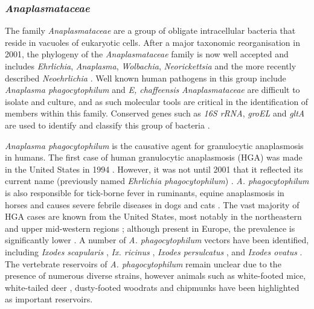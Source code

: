 \documentclass[a4paper, nobind]{templates/ociamthesis}
\begin{document}
\hypertarget{anaplasmataceae}{%
\subsubsection{\texorpdfstring{\emph{Anaplasmataceae}}{Anaplasmataceae}}\label{anaplasmataceae}}

The family \emph{Anaplasmataceae} are a group of obligate intracellular bacteria that reside in vacuoles of eukaryotic cells.
After a major taxonomic reorganisation in 2001, the phylogeny of the \emph{Anaplasmataceae} family is now well accepted and includes \emph{Ehrlichia}, \emph{Anaplasma}, \emph{Wolbachia}, \emph{Neorickettsia} and the more recently described \emph{Neoehrlichia} \autocite{rarGeneticDiversityAnaplasma2021}.
Well known human pathogens in this group include \emph{Anaplasma phagocytophilum} and \emph{E, chaffeensis}
\emph{Anaplasmataceae} are difficult to isolate and culture, and as such molecular tools are critical in the identification of members within this family.
Conserved genes such as \emph{16S rRNA}, \emph{groEL} and \emph{gltA} are used to identify and classify this group of bacteria \autocite{kawaharaUltrastructurePhylogeneticAnalysis2004}.

\emph{Anaplasma phagocytophilum} is the causative agent for granulocytic anaplasmosis in humans. The first case of human granulocytic anaplasmosis (HGA) was made in the United States in 1994 \autocite{chenIdentificationGranulocytotropicEhrlichia1994}.
However, it was not until 2001 that it reflected its current name (previously named \emph{Ehrlichia phagocytophilum}) \autocite{dumlerReorganizationGeneraFamilies2001}.
\emph{A. phagocytophilum} is also responsible for tick-borne fever in ruminants, equine anaplasmosis in horses and causes severe febrile diseases in dogs and cats \autocite{rarAnaplasmaEhrlichiaCandidatus2011}.
The vast majority of HGA cases are known from the United States, most notably in the northeastern and upper mid-western regions \autocite{mmwrFinal2009Reports2010}; although present in Europe, the prevalence is significantly lower \autocite{bakkenHumanGranulocyticAnaplasmosis2015}.
A number of \emph{A. phagocytophilum} vectors have been identified, including \emph{Ixodes scapularis} \autocite{telfordPerpetuationAgentHuman1996,hodzicAcquisitionTransmissionAgent1998}, \emph{Ix. ricinus} \autocite{lizPCRDetectionGranulocytic2000}, \emph{Ixodes persulcatus} \autocite{eremeevaPrevalenceBacterialAgents2006}, and \emph{Ixodes ovatus} \autocite{ohashiAnaplasmaPhagocytophilumInfected2005}.
The vertebrate reservoirs of \emph{A. phagocytophilum} remain unclear due to the presence of numerous diverse strains, however animals such as white-footed mice, white-tailed deer \autocite{telfordPerpetuationAgentHuman1996,ravynIsolationEtiologicAgent2001}, dusty-footed woodrats \autocite{nicholsonDuskyFootedWoodRats1999} and chipmunks \autocite{foleyDistinctEcologicallyRelevant2009} have been highlighted as important reservoirs.
\end{document}
